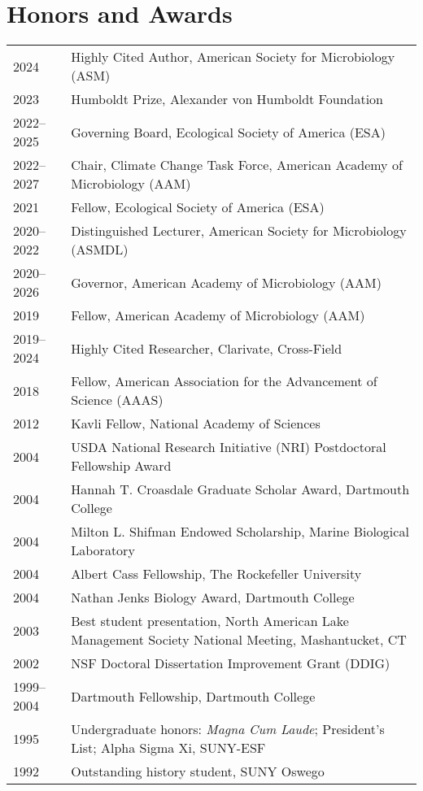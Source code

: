 \documentclass[11pt]{article}
\begin{document}
\section*{Honors and Awards}
\vspace{-1.25em} %
\noindent
\begin{tabularx}{\textwidth}{@{}l@{\hspace{2em}}X@{}}
2024        & Highly Cited Author, American Society for Microbiology (ASM) \\
2023        & Humboldt Prize, Alexander von Humboldt Foundation \\
2022--2025  & Governing Board, Ecological Society of America (ESA) \\
2022--2027  & Chair, Climate Change Task Force, American Academy of Microbiology (AAM) \\
2021        & Fellow, Ecological Society of America (ESA) \\
2020--2022  & Distinguished Lecturer, American Society for Microbiology (ASMDL) \\
2020--2026  & Governor, American Academy of Microbiology (AAM) \\
2019        & Fellow, American Academy of Microbiology (AAM) \\
2019--2024  & Highly Cited Researcher, Clarivate, Cross-Field \\
2018        & Fellow, American Association for the Advancement of Science (AAAS) \\
2012        & Kavli Fellow, National Academy of Sciences \\
2004        & USDA National Research Initiative (NRI) Postdoctoral Fellowship Award \\
2004        & Hannah T. Croasdale Graduate Scholar Award, Dartmouth College \\
2004        & Milton L. Shifman Endowed Scholarship, Marine Biological Laboratory \\
2004        & Albert Cass Fellowship, The Rockefeller University \\
2004        & Nathan Jenks Biology Award, Dartmouth College \\
2003        & Best student presentation, North American Lake Management Society National Meeting, Mashantucket, CT \\
2002        & NSF Doctoral Dissertation Improvement Grant (DDIG) \\
1999--2004  & Dartmouth Fellowship, Dartmouth College \\
1995        & Undergraduate honors: \textit{Magna Cum Laude}; President’s List; Alpha Sigma Xi, SUNY-ESF \\
1992        & Outstanding history student, SUNY Oswego \\
\end{tabularx}
\end{document}
